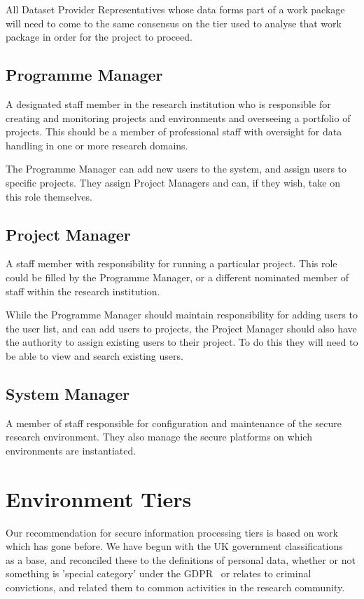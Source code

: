 \documentclass[10pt,a4paper,twocolumn]{article}
\begin{document}
All Dataset Provider Representatives whose data forms part of a work package will need to come to the same consensus on the tier used to analyse that work package in order for the project to proceed.

\subsection{Programme Manager}

A designated staff member in the research institution who is responsible for creating and monitoring projects and environments and overseeing a portfolio of projects.
This should be a member of professional staff with oversight for data handling in one or more research domains.

The Programme Manager can add new users to the system, and assign users to specific projects. They assign Project Managers and can, if they wish, take on this role themselves.

\subsection{Project Manager}
A staff member with responsibility for running a particular project. This role could be filled by the Programme Manager, or a different nominated member of staff within the research institution.

While the Programme Manager should maintain responsibility for adding users to the user list, and can add users to projects, the Project Manager should also have the authority to assign existing users to their project. To do this they will need to be able to view and search existing users.

\subsection{System Manager}

A member of staff responsible for configuration and maintenance of the secure research environment. They also manage the secure platforms on which environments are instantiated.

\section{Environment Tiers}

Our recommendation for secure information processing tiers is based on work which has gone before. We have begun with the UK government classifications~\cite{classifications} as a base, and reconciled these to the definitions of personal data, whether or not something is 'special category' under the GDPR~\cite{GDPR} or  relates to criminal convictions, and related them to common activities in the research community. 
\end{document}
